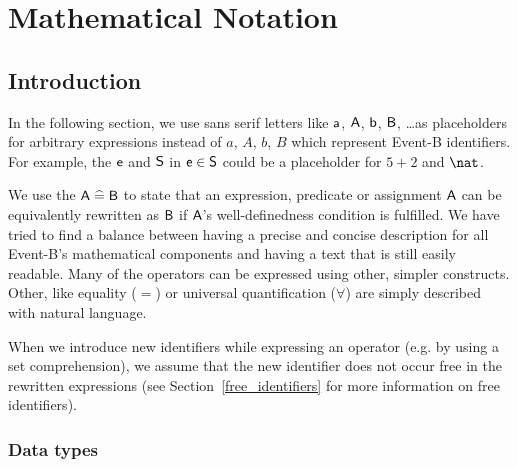 \clearpage
\section{Mathematical Notation}
\label{mathematical_notation}

\subsection{Introduction}
\label{mathematical_notation_introduction}

In the following section, we use sans serif letters like $\textsf{a}$, $\textsf{A}$, $\textsf{b}$, $\textsf{B}$, \ldots as
placeholders for arbitrary expressions instead of $a$, $A$, $b$, $B$ which represent
Event-B identifiers.
For example, the $\textsf{e}$ and $\textsf{S}$ in $\textsf{e}\in\textsf{S}$ could be a placeholder for $5+2$ and $\nat$.

We use the $\textsf{A}\mathrel{\widehat=}\textsf{B}$ to state that an expression, predicate or assignment $\textsf{A}$
can be equivalently rewritten as $\textsf{B}$ if $\textsf{A}$'s  well-definedness condition
is fulfilled.
We have tried to find a balance between having a precise and concise description for all Event-B's
mathematical components and having a text that is still easily readable.
Many of the operators can be expressed using other, simpler constructs.
Other, like equality ($=$) or universal quantification ($\forall$) are simply described with natural language.

When we introduce new identifiers while expressing an operator (e.g. by using a set comprehension),
we assume that the new identifier does not occur free in the rewritten expressions
(see Section~\ref{free_identifiers} for more information on free identifiers).


\subsubsection{Data types}
\label{data_types}

